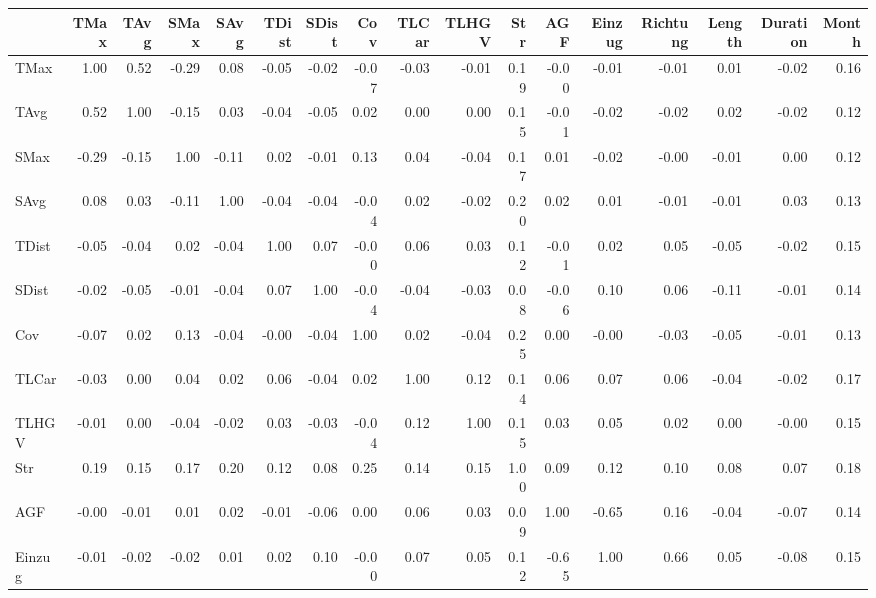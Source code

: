 \begin{tabular}{lrrrrrrrrrrrrrrrr}
\toprule
{} &  TMax &  TAvg &  SMax &  SAvg &  TDist &  SDist &   Cov &  TLCar &  TLHGV &  Str &   AGF &  Einzug &  Richtung &  Length &  Duration &  Month \\
\midrule
TMax     &  1.00 &  0.52 & -0.29 &  0.08 &  -0.05 &  -0.02 & -0.07 &  -0.03 &  -0.01 & 0.19 & -0.00 &   -0.01 &     -0.01 &    0.01 &     -0.02 &   0.16 \\
TAvg     &  0.52 &  1.00 & -0.15 &  0.03 &  -0.04 &  -0.05 &  0.02 &   0.00 &   0.00 & 0.15 & -0.01 &   -0.02 &     -0.02 &    0.02 &     -0.02 &   0.12 \\
SMax     & -0.29 & -0.15 &  1.00 & -0.11 &   0.02 &  -0.01 &  0.13 &   0.04 &  -0.04 & 0.17 &  0.01 &   -0.02 &     -0.00 &   -0.01 &      0.00 &   0.12 \\
SAvg     &  0.08 &  0.03 & -0.11 &  1.00 &  -0.04 &  -0.04 & -0.04 &   0.02 &  -0.02 & 0.20 &  0.02 &    0.01 &     -0.01 &   -0.01 &      0.03 &   0.13 \\
TDist    & -0.05 & -0.04 &  0.02 & -0.04 &   1.00 &   0.07 & -0.00 &   0.06 &   0.03 & 0.12 & -0.01 &    0.02 &      0.05 &   -0.05 &     -0.02 &   0.15 \\
SDist    & -0.02 & -0.05 & -0.01 & -0.04 &   0.07 &   1.00 & -0.04 &  -0.04 &  -0.03 & 0.08 & -0.06 &    0.10 &      0.06 &   -0.11 &     -0.01 &   0.14 \\
Cov      & -0.07 &  0.02 &  0.13 & -0.04 &  -0.00 &  -0.04 &  1.00 &   0.02 &  -0.04 & 0.25 &  0.00 &   -0.00 &     -0.03 &   -0.05 &     -0.01 &   0.13 \\
TLCar    & -0.03 &  0.00 &  0.04 &  0.02 &   0.06 &  -0.04 &  0.02 &   1.00 &   0.12 & 0.14 &  0.06 &    0.07 &      0.06 &   -0.04 &     -0.02 &   0.17 \\
TLHGV    & -0.01 &  0.00 & -0.04 & -0.02 &   0.03 &  -0.03 & -0.04 &   0.12 &   1.00 & 0.15 &  0.03 &    0.05 &      0.02 &    0.00 &     -0.00 &   0.15 \\
Str      &  0.19 &  0.15 &  0.17 &  0.20 &   0.12 &   0.08 &  0.25 &   0.14 &   0.15 & 1.00 &  0.09 &    0.12 &      0.10 &    0.08 &      0.07 &   0.18 \\
AGF      & -0.00 & -0.01 &  0.01 &  0.02 &  -0.01 &  -0.06 &  0.00 &   0.06 &   0.03 & 0.09 &  1.00 &   -0.65 &      0.16 &   -0.04 &     -0.07 &   0.14 \\
Einzug   & -0.01 & -0.02 & -0.02 &  0.01 &   0.02 &   0.10 & -0.00 &   0.07 &   0.05 & 0.12 & -0.65 &    1.00 &      0.66 &    0.05 &     -0.08 &   0.15 \\

\end{tabular}
